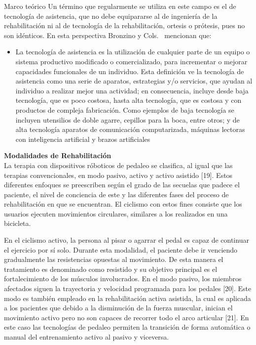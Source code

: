 \begin{thesischapter}{1} {Marco teórico}
    \vspace{10pt}
    Un término que regularmente se utiliza en este campo es el de tecnología de asistencia, que
    no debe equipararse al de ingeniería de la rehabilitación ni al de tecnología de la rehabilitación, ortesis o 
    prótesis, pues no son idénticos. En esta perspectiva Bronzino y Cols.~\cite{enderle2012introduction}  mencionan que:

    \begin{itemize}
        \item  La tecnología de asistencia es la utilización de cualquier parte de un equipo o sistema productivo modificado o comercializado, para incrementar o mejorar capacidades funcionales de un individuo. Esta definición ve
        la tecnología de asistencia como una serie de aparatos, estrategias y/o servicios, que ayudan al individuo a realizar mejor una actividad; en consecuencia, incluye desde baja
        tecnología, que es poco costosa, hasta alta tecnología, que es costosa y con productos de compleja fabricación. Como ejemplos de baja
        tecnología se incluyen utensilios de doble agarre, cepillos para la boca, entre otros; y de
        alta tecnología aparatos de comunicación computarizada, máquinas lectoras con inteligencia artificial y brazos artificiales
    \end{itemize}
    
    \vspace{10pt}
    \textbf{Modalidades de Rehabilitación} \\ 
    La terapia con dispositivos róboticos de pedaleo se clasifica, al igual que las terapias
    convencionales, en modo pasivo, activo y activo asistido [19]. Estos diferentes enfoques
    se preescriben según el grado de las secuelas que padece el paciente, el nivel de
    conciencia de este y las diferentes fases del proceso de rehabilitación en que se
    encuentran. El ciclismo con estos fines consiste que los usuarios ejecuten movimientos
    circulares, similares a los realizados en una bicicleta.

    \vspace{5pt}
    En el ciclismo activo, la persona al pisar o agarrar el pedal es capaz de continuar el
    ejercicio por sí solo. Durante esta modalidad, el paciente debe ir venciendo gradualmente
    las resistencias opuestas al movimiento. De esta manera el tratamiento es denominado
    como resistido y su objetivo principal es el fortalecimiento de los músculos involucrados.
    En el modo pasivo, los miembros afectados siguen la trayectoria y velocidad programada
    para los pedales [20]. Este modo es también empleado en la rehabilitación activa asistida,
    la cual es aplicada a los pacientes que debido a la disminución de la fuerza muscular,
    inician el movimiento activo pero no son capaces de recorrer todo el arco articular [21].
    En este caso las tecnologías de pedaleo permiten la transición de forma automática o
    manual del entrenamiento activo al pasivo y viceversa.


\end{thesischapter}
